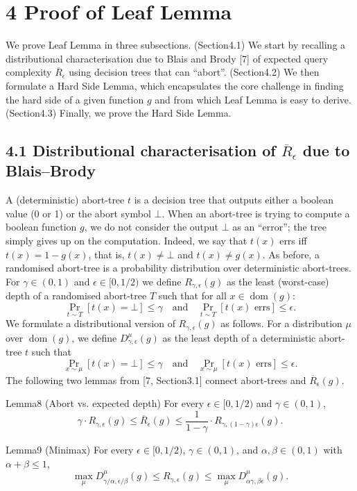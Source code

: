 \section*{4 Proof of Leaf Lemma}
We prove Leaf Lemma in three subsections.
(Section4.1) We start by recalling a distributional characterisation due to Blais and Brody [7] of expected query complexity $\overline R_\epsilon$ using decision trees that can ``abort''.
(Section4.2) We then formulate a Hard Side Lemma, which encapsulates the core challenge in finding the hard side of a given function $g$ and from which Leaf Lemma is easy to derive.
(Section4.3) Finally, we prove the Hard Side Lemma.
\subsection*{4.1 Distributional characterisation of $\overline R_\epsilon$ due to Blais--Brody}
A (deterministic) abort-tree $t$ is a decision tree that outputs either a boolean value (0 or 1) or the abort symbol $\bot$. When an abort-tree is trying to compute a boolean function $g$, we do not consider the output $\bot$ as an ``error''; the tree simply gives up on the computation. Indeed, we say that $t(x)$ errs iff $t(x)=1-g(x)$, that is, $t(x)\ne\bot$ and $t(x)\ne g(x)$. As before, a randomised abort-tree is a probability distribution over deterministic abort-trees. For $\gamma\in(0,1)$ and $\epsilon\in[0,1/2)$ we define $R_{\gamma,\epsilon}(g)$ as the least (worst-case) depth of a randomised abort-tree $T$ such that for all $x\in\operatorname{dom}(g)$:
\[\Pr_{t\sim T}[t(x)=\bot]\le\gamma\quad\text{and}\quad\Pr_{t\sim T}[t(x)\text{ errs}]\le\epsilon.\]
We formulate a distributional version of $R_{\gamma,\epsilon}(g)$ as follows. For a distribution $\mu$ over $\operatorname{dom}(g)$, we define $D^\mu_{\gamma,\epsilon}(g)$ as the least depth of a deterministic abort-tree $t$ such that
\[\Pr_{x\sim\mu}[t(x)=\bot]\le\gamma\quad\text{and}\quad\Pr_{x\sim\mu}[t(x)\text{ errs}]\le\epsilon.\]
The following two lemmas from [7, Section3.1] connect abort-trees and $\overline R_\epsilon(g)$.
\begin{authorclaim}{Lemma8 (Abort vs. expected depth)}
For every $\epsilon\in[0,1/2)$ and $\gamma\in(0,1)$,
\[\gamma\cdot R_{\gamma,\epsilon}(g)\le\overline R_\epsilon(g)\le\frac1{1-\gamma}\cdot R_{\gamma,(1-\gamma)\epsilon}(g).\]
\end{authorclaim}
\begin{authorclaim}{Lemma9 (Minimax)}
For every $\epsilon\in[0,1/2)$, $\gamma\in(0,1)$, and $\alpha,\beta\in(0,1)$ with $\alpha+\beta\le1$,
\[\max_\mu D^\mu_{\gamma/\alpha,\epsilon/\beta}(g)\le R_{\gamma,\epsilon}(g)\le\max_\mu D^\mu_{\alpha\gamma,\beta\epsilon}(g).\]
\end{authorclaim}

